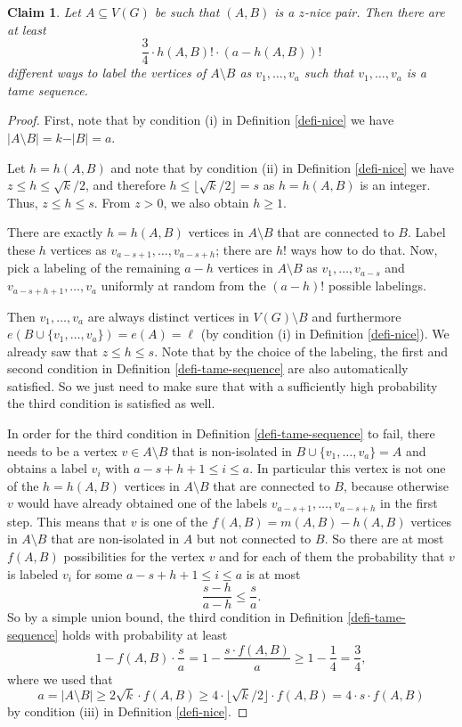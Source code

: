 \documentclass[11pt]{article}
\newtheorem{claim}[theorem]{Claim}
\theoremstyle{definition}
\numberwithin{equation}{section}
\begin{document}
\begin{claim}\label{claim-count-labelings} Let $A\subseteq V(G)$ be such that $(A,B)$ is a $z$-nice pair. Then there are at least
\[\frac{3}{4}\cdot  h(A,B)!\cdot (a-h(A,B))!\]
different ways to  label the vertices of $A\setminus B$ as $v_1,\dots,v_a$ such that $v_1,\dots,v_a$ is a tame sequence.
\end{claim}
\begin{proof}First, note that by condition (i) in Definition \ref{defi-nice} we have $\vert A\setminus B\vert=k-\vert B\vert=a$.

Let $h=h(A,B)$ and note that by condition (ii) in Definition \ref{defi-nice} we have $z\leq h\leq \sqrt{k}/2$, and therefore $h\leq \lfloor \sqrt{k}/2\rfloor=s$ as $h=h(A,B)$ is an integer. Thus, $z\leq h\leq s$. From $z>0$, we also obtain $h\geq 1$. 

There are exactly $h=h(A,B)$ vertices in $A\setminus B$ that are connected to $B$. Label these $h$ vertices as $v_{a-s+1},\dots,v_{a-s+h}$; there are $h!$ ways how to do that. Now, pick a labeling of the remaining $a-h$ vertices in $A\setminus B$ as $v_1,\dots,v_{a-s}$ and $v_{a-s+h+1},\dots,v_a$ uniformly at random from the $(a-h)!$ possible labelings.

Then $v_1,\dots,v_a$ are always distinct vertices in $V(G)\setminus B$ and furthermore $e(B\cup \lbrace v_1,\dots,v_a\rbrace)=e(A)=\ell$ (by condition (i) in Definition \ref{defi-nice}). We already saw that $z\leq h\leq s$. Note that by the choice of the labeling, the first and second condition in Definition \ref{defi-tame-sequence} are also automatically satisfied. So we just need to make sure that with a sufficiently high probability the third condition is satisfied as well.

In order for the third condition in Definition \ref{defi-tame-sequence} to fail, there needs to be a vertex $v\in A\setminus B$ that is non-isolated in $B\cup \lbrace v_1,\dots,v_a\rbrace=A$ and obtains a label $v_i$ with $a-s+h+1\leq i\leq a$. In particular this vertex is not one of the $h=h(A,B)$ vertices in $A\setminus B$ that are connected to $B$, because otherwise $v$ would have already obtained one of the labels $v_{a-s+1},\dots,v_{a-s+h}$ in the first step. This means that $v$ is one of the $f(A,B)=m(A,B)-h(A,B)$ vertices in $A\setminus B$ that are non-isolated in $A$ but not connected to $B$. So there are at most $f(A,B)$ possibilities for the vertex $v$ and for each of them the probability that $v$ is labeled $v_i$ for some $a-s+h+1\leq i\leq a$ is at most
\[\frac{s-h}{a-h}\leq \frac{s}{a}.\]
So by a simple union bound, the third condition in Definition \ref{defi-tame-sequence} holds with probability at least
\[1-f(A,B)\cdot \frac{s}{a}= 1-\frac{s\cdot f(A,B)}{a}\geq 1-\frac{1}{4}=\frac{3}{4},\]
where we used that
\[a=\vert A\setminus B\vert \geq  2\sqrt{k}\cdot f(A,B)\geq 4\cdot \lfloor\sqrt{k}/2\rfloor\cdot f(A,B)=4\cdot s\cdot f(A,B)\]
by condition (iii) in Definition \ref{defi-nice}.


\end{proof}
\end{document}
